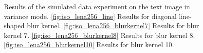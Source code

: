 \documentclass[12pt,notitlepage]{report}
\begin{document}
\clearpage

\begin{figure}[htb]
  \centering

  \caption[Results for the text image in variance mode]{Results of the simulated data experiment on the text image in variance mode. \ref{fig:iso_lena256_line} Results for diagonal line-shaped blur kernel. \ref{fig:iso_lena256_blurkernel7} Results for blur kernel 7. \ref{fig:iso_lena256_blurkernel8} Results for blur kernel 8. \ref{fig:iso_lena256_blurkernel10} Results for blur kernel 10.}
  \label{fig:var_text256}
\end{figure}
\end{document}
